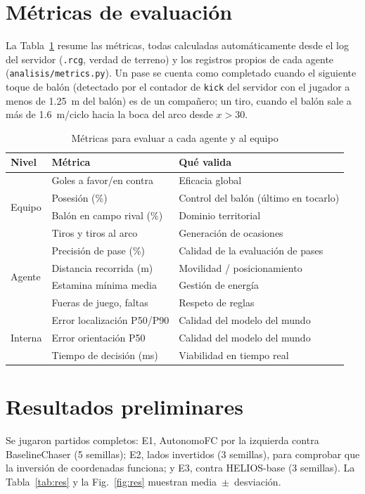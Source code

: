 \documentclass[conference,10pt]{IEEEtran}
\begin{document}
\section{Métricas de evaluación}
La Tabla~\ref{tab:metricas} resume las métricas, todas calculadas
automáticamente desde el log del servidor (\texttt{.rcg}, verdad de terreno)
y los registros propios de cada agente (\texttt{analisis/metrics.py}). Un
pase se cuenta como completado cuando el siguiente toque de balón (detectado
por el contador de \texttt{kick} del servidor con el jugador a menos de
1.25~m del balón) es de un compañero; un tiro, cuando el balón sale a más de
1.6~m/ciclo hacia la boca del arco desde $x>30$.

\begin{table}[t]
\caption{Métricas para evaluar a cada agente y al equipo}
\label{tab:metricas}
\centering
\footnotesize
\setlength{\tabcolsep}{3pt}
\begin{tabular}{@{}p{1.0cm}p{3.1cm}p{3.8cm}@{}}
\toprule
Nivel & Métrica & Qué valida \\
\midrule
\multirow{4}{*}{Equipo} & Goles a favor/en contra & Eficacia global \\
 & Posesión (\%) & Control del balón (último en tocarlo) \\
 & Balón en campo rival (\%) & Dominio territorial \\
 & Tiros y tiros al arco & Generación de ocasiones \\
\midrule
\multirow{4}{*}{Agente} & Precisión de pase (\%) & Calidad de la evaluación de pases \\
 & Distancia recorrida (m) & Movilidad / posicionamiento \\
 & Estamina mínima media & Gestión de energía \\
 & Fueras de juego, faltas & Respeto de reglas \\
\midrule
\multirow{3}{*}{Interna} & Error localización P50/P90 & Calidad del modelo del mundo \\
 & Error orientación P50 & Calidad del modelo del mundo \\
 & Tiempo de decisión (ms) & Viabilidad en tiempo real \\
\bottomrule
\end{tabular}
\vspace{-1em}
\end{table}

\section{Resultados preliminares}
Se jugaron \ExpTotal{} partidos completos: E1, AutonomoFC por la izquierda
contra BaselineChaser (5 semillas); E2, lados invertidos (3 semillas), para
comprobar que la inversión de coordenadas funciona; y E3, contra HELIOS-base
(3 semillas). La Tabla~\ref{tab:res} y la Fig.~\ref{fig:res} muestran
media~$\pm$~desviación.
\end{document}
